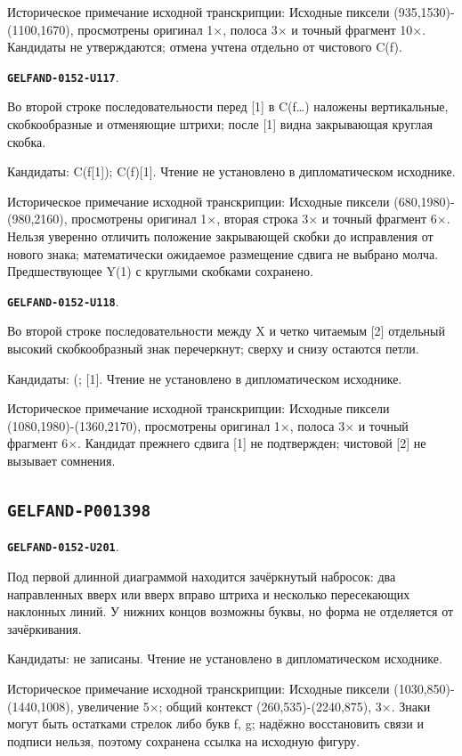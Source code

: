 \documentclass[11pt]{article}
\theoremstyle{definition}
\theoremstyle{remark}
\begin{document}
Историческое примечание исходной транскрипции: Исходные пиксели (935,1530)-(1100,1670), просмотрены оригинал 1×, полоса 3× и точный фрагмент 10×. Кандидаты не утверждаются; отмена учтена отдельно от чистового C(f).\par\medskip
\par\noindent\leavevmode{}\label{GELFAND-0152-U117}\label{GELFAND-P001397:sequence-shifted-cone:note}\textbf{\texttt{GELFAND-0152-U117}}.\nopagebreak[4]\par
Во второй строке последовательности перед [1] в C(f…) наложены вертикальные, скобкообразные и отменяющие штрихи; после [1] видна закрывающая круглая скобка.\par
Кандидаты: C(f[1]); C(f)[1]. Чтение не установлено в дипломатическом исходнике.\par
Историческое примечание исходной транскрипции: Исходные пиксели (680,1980)-(980,2160), просмотрены оригинал 1×, вторая строка 3× и точный фрагмент 6×. Нельзя уверенно отличить положение закрывающей скобки до исправления от нового знака; математически ожидаемое размещение сдвига не выбрано молча. Предшествующее Y(1) с круглыми скобками сохранено.\par\medskip
\par\noindent\leavevmode{}\label{GELFAND-0152-U118}\label{GELFAND-P001397:sequence-shift-cancellation:note}\textbf{\texttt{GELFAND-0152-U118}}.\nopagebreak[4]\par
Во второй строке последовательности между X и четко читаемым [2] отдельный высокий скобкообразный знак перечеркнут; сверху и снизу остаются петли.\par
Кандидаты: (; [1]. Чтение не установлено в дипломатическом исходнике.\par
Историческое примечание исходной транскрипции: Исходные пиксели (1080,1980)-(1360,2170), просмотрены оригинал 1×, полоса 3× и точный фрагмент 6×. Кандидат прежнего сдвига [1] не подтвержден; чистовой [2] не вызывает сомнения.\par\medskip
\subsection*{\texttt{GELFAND-P001398}}
\par\noindent\leavevmode{}\label{GELFAND-0152-U201}\label{GELFAND-P001398:cancelled-sketch:note}\textbf{\texttt{GELFAND-0152-U201}}.\nopagebreak[4]\par
Под первой длинной диаграммой находится зачёркнутый набросок: два направленных вверх или вверх вправо штриха и несколько пересекающих наклонных линий. У нижних концов возможны буквы, но форма не отделяется от зачёркивания.\par
Кандидаты: не записаны. Чтение не установлено в дипломатическом исходнике.\par
Историческое примечание исходной транскрипции: Исходные пиксели (1030,850)-(1440,1008), увеличение 5×; общий контекст (260,535)-(2240,875), 3×. Знаки могут быть остатками стрелок либо букв f, g; надёжно восстановить связи и подписи нельзя, поэтому сохранена ссылка на исходную фигуру.\par\medskip
\end{document}
